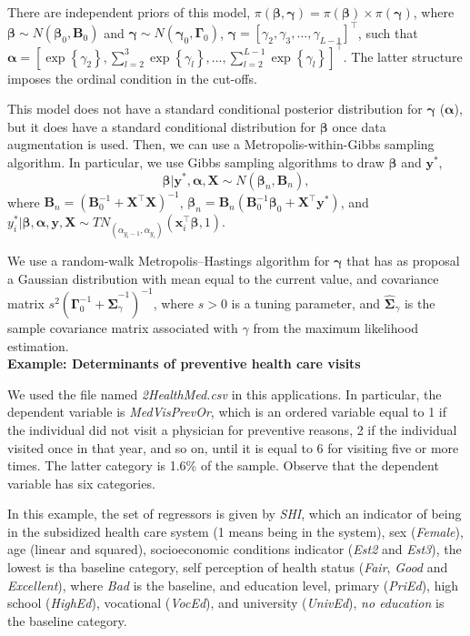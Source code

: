 There are independent priors of this model, $\pi(\bm{\beta},\bm{\gamma})=\pi(\bm{\beta})\times \pi(\bm{\gamma})$, where $\bm{\beta}\sim N(\bm{\beta}_0,\bm{B}_0)$ and $\bm{\gamma}\sim N(\bm{\gamma}_0,\bm{\Gamma}_0)$, $\bm{\gamma}=\left[\gamma_2,\gamma_3,\dots,\gamma_{L-1}\right]^{\top}$, such that $\bm{\alpha}=\left[\exp\left\{\gamma_2\right\},\sum_{l=2}^3\exp\left\{\gamma_l\right\},\dots,\sum_{l=2}^{L-1}\exp\left\{\gamma_l\right\}\right]^{\top}$. The latter structure imposes the ordinal condition in the cut-offs.

This model does not have a standard conditional posterior distribution for $\bm{\gamma}$ ($\bm{\alpha}$), but it does have a standard conditional distribution for $\bm{\beta}$ once data augmentation is used. Then, we can use a Metropolis-within-Gibbs sampling algorithm. In particular, we use Gibbs sampling algorithms to draw $\bm{\beta}$ and $\bm{y}^*$,
\begin{equation*}
	\bm{\beta}|\bm{y}^*, \bm{\alpha}, \bm{X} \sim N(\bm{\beta}_n,\bm{B}_n), 
\end{equation*}
where $\bm{B}_n = (\bm{B}_0^{-1} + \bm{X}^{\top}\bm{X})^{-1}$, $\bm{\beta}_n= \bm{B}_n(\bm{B}_0^{-1}\bm{\beta}_0 + \bm{X}^{\top}\bm{y}^*)$, and $y_i^*|\bm{\beta},\bm{\alpha},\bm{y},\bm{X}\sim TN_{(\alpha_{y_i-1},\alpha_{y_i})}(\bm{x}_i^{\top}\bm{\beta},1)$.

We use a random-walk Metropolis--Hastings algorithm for $\bm{\gamma}$ that has as proposal a Gaussian distribution with mean equal to the current value, and covariance matrix $s^2(\bm{\Gamma}_0^{-1}+\hat{\bm{\Sigma}}_{\gamma}^{-1})^{-1}$, where $s>0$ is a tuning parameter, and $\hat{\bm{\Sigma}}_{\gamma}$ is the sample covariance matrix associated with $\gamma$ from the maximum likelihood estimation.\\

\textbf{Example: Determinants of preventive health care visits}

We used the file named \textit{2HealthMed.csv} in this applications. In particular, the dependent variable is \textit{MedVisPrevOr}, which is an ordered variable equal to 1 if the individual did not visit a physician for preventive reasons, 2 if the individual visited once in that year, and so on, until it is equal to 6 for visiting five or more times. The latter category is 1.6\% of the sample. Observe that the dependent variable has six categories.

In this example, the set of regressors is given by \textit{SHI}, which an indicator of being in the subsidized health care system (1 means being in the system), sex (\textit{Female}), age (linear and squared), socioeconomic conditions indicator (\textit{Est2} and \textit{Est3}), the lowest is tha baseline category, self perception of health status (\textit{Fair}, \textit{Good} and \textit{Excellent}), where \textit{Bad} is the baseline, and education level, primary (\textit{PriEd}), high school (\textit{HighEd}), vocational (\textit{VocEd}), and university (\textit{UnivEd}), \textit{no education} is the baseline category.


